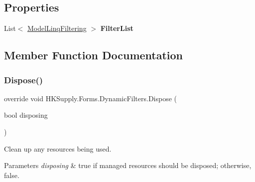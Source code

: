 \subsection*{Properties}
\begin{DoxyCompactItemize}
\item 
\mbox{\label{class_h_k_supply_1_1_forms_1_1_dynamic_filters_a7b0d4402fc028c3401ab569dc0ce150e}} 
List$<$ \mbox{\hyperlink{class_h_k_supply_1_1_forms_1_1_model_linq_filtering}{Model\+Linq\+Filtering}} $>$ {\bfseries Filter\+List}
\end{DoxyCompactItemize}


\subsection{Member Function Documentation}
\mbox{\label{class_h_k_supply_1_1_forms_1_1_dynamic_filters_a02f9f684c77b0ed2ba2aca58c0b87ec3}} 
\subsubsection{\texorpdfstring{Dispose()}{Dispose()}}
{\footnotesize\ttfamily override void H\+K\+Supply.\+Forms.\+Dynamic\+Filters.\+Dispose (\begin{DoxyParamCaption}\item[{bool}]{disposing }\end{DoxyParamCaption})\hspace{0.3cm}{\ttfamily [protected]}}



Clean up any resources being used. 


\begin{DoxyParams}{Parameters}
{\em disposing} & true if managed resources should be disposed; otherwise, false.\\
\hline
\end{DoxyParams}
\mbox{\label{class_h_k_supply_1_1_forms_1_1_dynamic_filters_a3fb309c2a83dbe6c5826c25007c5336f}} 
